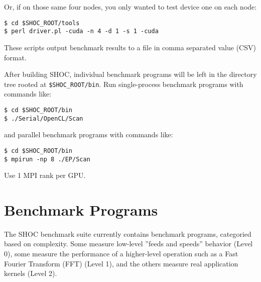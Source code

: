 \documentclass[11pt]{article}
\begin{document}
Or, if on those same four nodes, you only wanted to test device one on each node:

\begin{Verbatim}[frame=single]
$ cd $SHOC_ROOT/tools
$ perl driver.pl -cuda -n 4 -d 1 -s 1 -cuda
\end{Verbatim}

These scripts output benchmark results to a file in comma separated value (CSV) format.

After building SHOC, individual benchmark programs will be left in the
directory tree rooted at \verb+$SHOC_ROOT/bin+.
Run single-process benchmark programs with commands like:

\begin{Verbatim}[frame=single]
$ cd $SHOC_ROOT/bin
$ ./Serial/OpenCL/Scan 
\end{Verbatim}

and parallel benchmark programs with commands like:

\begin{Verbatim}[frame=single]
$ cd $SHOC_ROOT/bin
$ mpirun -np 8 ./EP/Scan
\end{Verbatim}

Use 1 MPI rank per GPU.  


\section{Benchmark Programs}\label{sec:programs}

The SHOC benchmark suite currently contains benchmark programs, categoried
based on complexity.  Some measure low-level ''feeds and speeds'' behavior
(Level 0), some measure the performance of a higher-level operation such 
as a Fast Fourier Transform (FFT) (Level 1), and the others measure 
real application kernels (Level 2).

\newpage 
\end{document}
